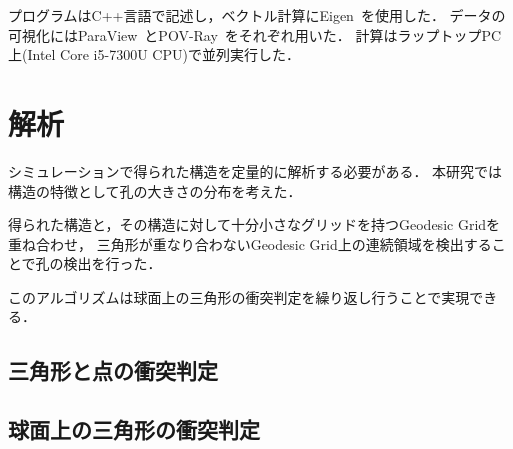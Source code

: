 プログラムはC++言語で記述し，ベクトル計算にEigen~\cite{eigenweb}を使用した．
データの可視化にはParaView~\cite{paraview}とPOV-Ray~\cite{povray}をそれぞれ用いた．
計算はラップトップPC上(Intel Core i5-7300U CPU)で並列実行した．


\section{解析}
シミュレーションで得られた構造を定量的に解析する必要がある．
本研究では構造の特徴として孔の大きさの分布を考えた．

得られた構造と，その構造に対して十分小さなグリッドを持つGeodesic Gridを重ね合わせ，
三角形が重なり合わないGeodesic Grid上の連続領域を検出することで孔の検出を行った．

このアルゴリズムは球面上の三角形の衝突判定を繰り返し行うことで実現できる．

\subsection{三角形と点の衝突判定}

\subsection{球面上の三角形の衝突判定}
